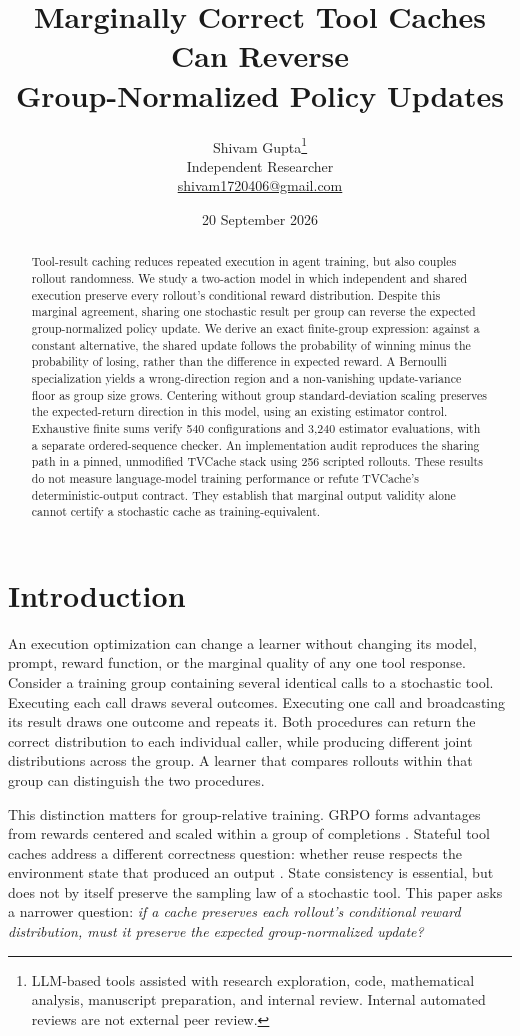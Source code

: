 \documentclass[10pt,letterpaper]{article}
\title{\vspace{-1.4em}\LARGE\bfseries Marginally Correct Tool Caches Can Reverse\\ Group-Normalized Policy Updates}
\author{\large Shivam Gupta\thanks{LLM-based tools assisted with research exploration, code, mathematical analysis, manuscript preparation, and internal review. Internal automated reviews are not external peer review.}\\[3pt]\normalsize Independent Researcher\\
\normalsize\href{mailto:shivam1720406@gmail.com}{shivam1720406@gmail.com}}
\date{20 September 2026}
\begin{document}
\maketitle
\thispagestyle{empty}
\begin{abstract}
Tool-result caching reduces repeated execution in agent training, but also
couples rollout randomness. We study a two-action model in which independent
and shared execution preserve every rollout's conditional reward distribution.
Despite this marginal agreement, sharing one stochastic result per group can
reverse the expected group-normalized policy update. We derive an exact
finite-group expression: against a constant alternative, the shared update
follows the probability of winning minus the probability of losing, rather
than the difference in expected reward. A Bernoulli specialization yields a
wrong-direction region and a non-vanishing update-variance floor as group size
grows. Centering without group standard-deviation scaling preserves the
expected-return direction in this model, using an existing estimator control.
Exhaustive finite sums verify 540 configurations and 3,240 estimator evaluations,
with a separate ordered-sequence checker. An implementation audit reproduces
the sharing path in a pinned, unmodified TVCache stack using 256 scripted
rollouts. These results do not measure language-model training performance or
refute TVCache's deterministic-output contract. They establish that marginal
output validity alone cannot certify a stochastic cache as training-equivalent.
\end{abstract}

\section{Introduction}
An execution optimization can change a learner without changing its model,
prompt, reward function, or the marginal quality of any one tool response.
Consider a training group containing several identical calls to a stochastic
tool. Executing each call draws several outcomes. Executing one call and
broadcasting its result draws one outcome and repeats it. Both procedures can
return the correct distribution to each individual caller, while producing
different joint distributions across the group. A learner that compares
rollouts within that group can distinguish the two procedures.

This distinction matters for group-relative training. GRPO forms advantages
from rewards centered and scaled within a group of completions
\cite{deepseekmath}. Stateful tool caches address a different correctness
question: whether reuse respects the environment state that produced an output
\cite{tvcache}. State consistency is essential, but does not by itself preserve
the sampling law of a stochastic tool. This paper asks a narrower question:
\emph{if a cache preserves each rollout's conditional reward distribution, must
it preserve the expected group-normalized update?}
\end{document}
